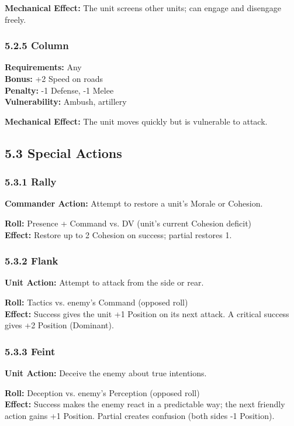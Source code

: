 \documentclass[11pt]{article}
\begin{document}
\textbf{Mechanical Effect:} The unit screens other units; can engage and disengage freely.

\subsubsection{5.2.5 Column}

\textbf{Requirements:} Any\\
\textbf{Bonus:} +2 Speed on roads\\
\textbf{Penalty:} -1 Defense, -1 Melee\\
\textbf{Vulnerability:} Ambush, artillery

\textbf{Mechanical Effect:} The unit moves quickly but is vulnerable to attack.

\subsection{5.3 Special Actions}

\subsubsection{5.3.1 Rally}

\textbf{Commander Action:} Attempt to restore a unit's Morale or Cohesion.

\textbf{Roll:} Presence + Command vs. DV (unit's current Cohesion deficit)\\
\textbf{Effect:} Restore up to 2 Cohesion on success; partial restores 1.

\subsubsection{5.3.2 Flank}

\textbf{Unit Action:} Attempt to attack from the side or rear.

\textbf{Roll:} Tactics vs. enemy's Command (opposed roll)\\
\textbf{Effect:} Success gives the unit +1 Position on its next attack. A critical success gives +2 Position (Dominant).

\subsubsection{5.3.3 Feint}

\textbf{Unit Action:} Deceive the enemy about true intentions.

\textbf{Roll:} Deception vs. enemy's Perception (opposed roll)\\
\textbf{Effect:} Success makes the enemy react in a predictable way; the next friendly action gains +1 Position. Partial creates confusion (both sides -1 Position).
\end{document}
